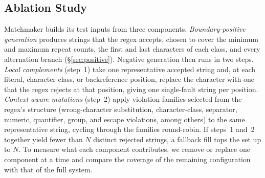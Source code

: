 \subsection{Ablation Study}
\label{sec:ablation}

Matchmaker builds its test inputs from three components. \emph{Boundary-positive
generation} produces strings that the regex accepts, chosen to cover the minimum
and maximum repeat counts, the first and last characters of each class, and every
alternation branch (\S\ref{sec:positive}). Negative generation then runs in two
steps. \emph{Local complements} (step~1) take one representative accepted string
and, at each literal, character class, or backreference position, replace the
character with one that the regex rejects at that position, giving one single-fault
string per position. \emph{Context-aware mutations} (step~2) apply violation
families selected from the regex's structure (wrong-character substitution,
character-class, separator, numeric, quantifier, group, and escape violations,
among others) to the same representative string, cycling through the families
round-robin. If steps~1 and~2 together yield fewer than $N$ distinct rejected
strings, a fallback fill tops the set up to $N$. To measure what each component
contributes, we remove or replace one component at a time and compare the
coverage of the remaining configuration with that of the full system.

